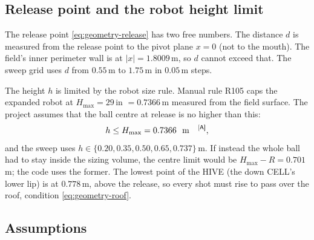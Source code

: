 \subsection{Release point and the robot height limit}
\label{sec:geometry-release}

The release point \eqref{eq:geometry-release} has two free numbers. The distance $d$ is measured from the
release point to the pivot plane $x = 0$ (not to the mouth). The field's inner perimeter wall is at
$|x| = 1.8009$\,\unit{m}\confirmed, so $d$ cannot exceed that. The sweep grid uses
$d$ from $0.55$\,\unit{m}\assumed{} to $1.75$\,\unit{m}\assumed{} in $0.05$\,\unit{m}\assumed{} steps.

The height $h$ is limited by the robot size rule. Manual rule R105 caps the expanded robot at
$H_{\max} = 29$\,\unit{in}\confirmed{} $= 0.7366$\,\unit{m}\confirmed{} measured from the field
surface. The project assumes that the ball centre at release is no higher than this:
\begin{equation}
  h \le H_{\max} = 0.7366\ \text{\unit{m}}\text{\assumed},
  \label{eq:geometry-hmax}
\end{equation}
and the sweep uses $h \in \{0.20, 0.35, 0.50, 0.65, 0.737\}$\,\unit{m}\assumed.
If instead the whole ball had to stay inside the sizing volume, the centre limit would be
$H_{\max} - R = 0.701$\,\unit{m}\derived; the code uses the former. The lowest point of the HIVE (the
down CELL's lower lip) is at $0.778$\,\unit{m}\derived{}, above the release, so every shot must rise to
pass over the roof, condition \eqref{eq:geometry-roof}.

\subsection{Assumptions}
\label{sec:geometry-assumptions}

